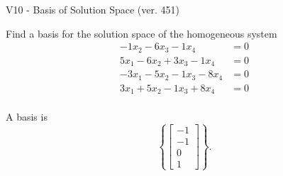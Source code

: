 \begin{exercise}
  \begin{exerciseTitle}V10 - Basis of Solution Space (ver. 451)\end{exerciseTitle}
  \begin{exerciseStatement}
    Find a basis for the solution space of the homogeneous system 
\begin{align*}
 -1 x_ 2 -6 x_ 3 -1 x_ 4 &= 0  \\ 
  5 x_ 1 -6 x_ 2 + 3 x_ 3 -1 x_ 4 &= 0  \\ 
  -3 x_ 1 -5 x_ 2 -1 x_ 3 -8 x_ 4 &= 0  \\ 
  3 x_ 1 + 5 x_ 2 -1 x_ 3 + 8 x_ 4 &= 0  \\ 
 \end{align*}


 
  \end{exerciseStatement}

  \begin{exerciseAnswer}
   A basis is   
\[\left\{\left[\begin{array}{c}
-1 \\
-1 \\
0 \\
1
\end{array}\right]\right\}.\]

  


  \end{exerciseAnswer}
\end{exercise}